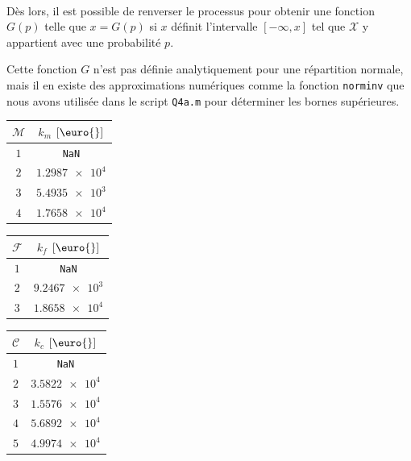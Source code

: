 \documentclass[a4paper, 12pt]{article}
\newcommand{\X}{\mathcal{X}}
\newcommand{\M}{\mathcal{M}}
\newcommand{\F}{\mathcal{F}}
\newcommand{\C}{\mathcal{C}}
\begin{document}
\begin{enumerate}[label=\roman*.]
\begin{align}
	\end{align}
	Dès lors, il est possible de renverser le processus pour obtenir une fonction $G(p)$ telle que $x = G(p)$ si $x$ définit l'intervalle $\left[-\infty,x\right]$ tel que $\X$ y appartient avec une probabilité $p$. \par
	Cette fonction $G$ n'est pas définie analytiquement pour une répartition normale, mais il en existe des approximations numériques comme la fonction \texttt{norminv} que nous avons utilisée dans le script \texttt{Q4a.m} pour déterminer les bornes supérieures.
	\begin{table}[H]
		\centering
		\begin{tabular}{|c|c|}
			\hline
			$\M$ & $k_m$ $\left[\textrm{\euro{}}\right]$ \\ \hline
			$1$  &             \texttt{NaN}              \\ \hline
			$2$  &           $\num{1.2987e4}$            \\ \hline
			$3$  &           $\num{5.4935e3}$            \\ \hline
			$4$  &           $\num{1.7658e4}$            \\ \hline
		\end{tabular}
		\hspace{2\mytextsize}
		\begin{tabular}{|c|c|}
			\hline
			$\F$ & $k_f$ $\left[\textrm{\euro{}}\right]$ \\ \hline
			$1$  &             \texttt{NaN}              \\ \hline
			$2$  &           $\num{9.2467e3}$            \\ \hline
			$3$  &           $\num{1.8658e4}$            \\ \hline
		\end{tabular}
		\hspace{2\mytextsize}
		\begin{tabular}{|c|c|}
			\hline
			$\C$ & $k_c$ $\left[\textrm{\euro{}}\right]$ \\ \hline
			$1$  &             \texttt{NaN}              \\ \hline
			$2$  &           $\num{3.5822e4}$            \\ \hline
			$3$  &           $\num{1.5576e4}$            \\ \hline
			$4$  &           $\num{5.6892e4}$            \\ \hline
			$5$  &           $\num{4.9974e4}$            \\ \hline
		\end{tabular}

\end{table}
\end{enumerate}
\end{document}
